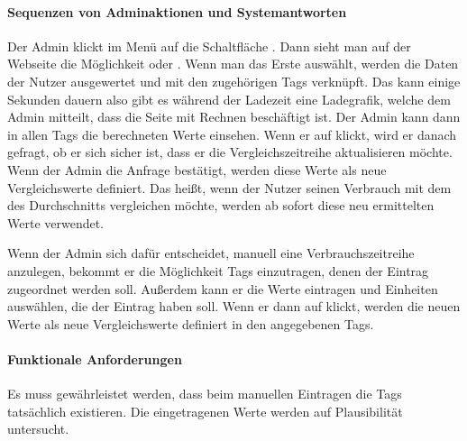 \paragraph{Sequenzen von Adminaktionen und Systemantworten}
Der Admin klickt im Menü auf die Schaltfläche .
Dann sieht man auf der Webseite die Möglichkeit  oder
.
Wenn man das Erste auswählt, werden die Daten der Nutzer ausgewertet und mit den zugehörigen Tags verknüpft.
Das kann einige Sekunden dauern also gibt es während der Ladezeit eine Ladegrafik,
welche dem Admin mitteilt, dass die Seite mit Rechnen beschäftigt ist.
Der Admin kann dann in allen Tags die berechneten Werte einsehen.
Wenn er auf  klickt,
wird er danach gefragt, ob er sich sicher ist, dass er die Vergleichszeitreihe aktualisieren möchte.
Wenn der Admin die Anfrage bestätigt, werden diese Werte als neue Vergleichswerte definiert.
Das heißt, wenn der Nutzer seinen Verbrauch mit dem des Durchschnitts vergleichen möchte,
werden ab sofort diese neu ermittelten Werte verwendet.

Wenn der Admin sich dafür entscheidet, manuell eine Verbrauchszeitreihe anzulegen,
bekommt er die Möglichkeit Tags einzutragen, denen der Eintrag zugeordnet werden soll.
Außerdem kann er die Werte eintragen und Einheiten auswählen, die der Eintrag haben soll.
Wenn er dann auf  klickt, werden die neuen Werte als
neue Vergleichswerte definiert in den angegebenen Tags.
\paragraph{Funktionale Anforderungen}
Es muss gewährleistet werden, dass beim manuellen Eintragen die Tags tatsächlich existieren.
Die eingetragenen Werte werden auf Plausibilität untersucht.

